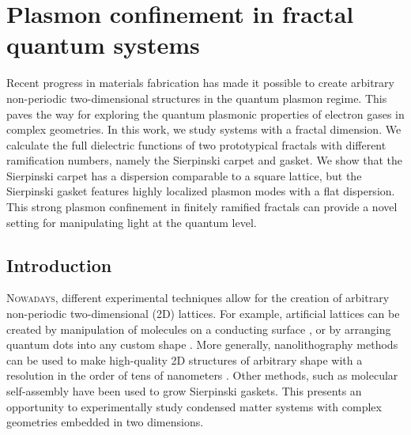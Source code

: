 \openleft%
\chapter{Plasmon confinement in fractal quantum systems}\label{ch:prb18}

{\small Recent progress in materials fabrication has made it possible to create arbitrary non-periodic two-dimensional structures in the quantum plasmon regime. This paves the way for exploring the quantum plasmonic properties of electron gases in complex geometries. In this work, we study systems with a fractal dimension.  We calculate the full dielectric functions of two prototypical fractals with different ramification numbers, namely the Sierpinski carpet and gasket. We show that the Sierpinski carpet has a dispersion comparable to a square lattice, but the Sierpinski gasket features highly localized plasmon modes with a flat dispersion. This strong plasmon confinement in finitely ramified fractals can provide a novel setting for manipulating light at the quantum level.}

\clearpage

\section{Introduction}

\lettrine[lines=3]{N}{owadays}, different experimental techniques allow for the creation of arbitrary non-periodic two-dimensional (2D) lattices. For example, artificial lattices can be created by manipulation of molecules on a conducting surface \cite{gomes2012designer, slot2017experimental}, or by arranging quantum dots into any custom shape \cite{engineering2009, artificial2013}.  More generally, nanolithography methods can be used to make high-quality 2D structures of arbitrary shape with a resolution in the order of tens of nanometers \cite{scarabelli2015fabrication}. Other methods, such as molecular self-assembly \cite{newkome2006nanoassembly, assembly2015} have been used to grow Sierpinski gaskets. This presents an opportunity to experimentally study condensed matter systems with complex geometries embedded in two dimensions.

